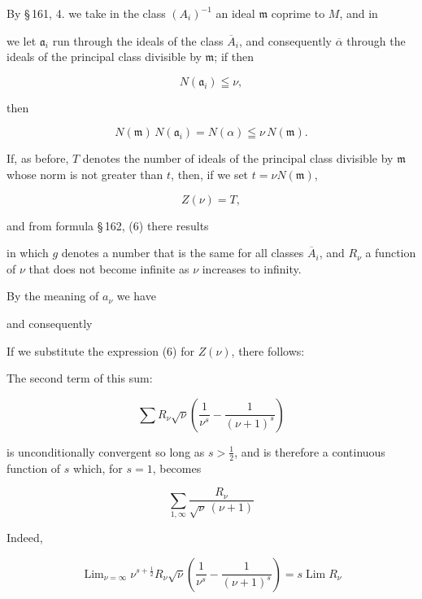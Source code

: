 
By \S\,161, 4. we take in the class $(A_i)^{-1}$ an ideal $\mathfrak{m}$ coprime to $M$, and in


we let $\mathfrak{a}_i$ run through the ideals of the class $\overline{A}_i$, and consequently $\overline{\alpha}$ through the ideals of the principal class divisible by $\mathfrak{m}$; if then

\[
N(\mathfrak{a}_i) \leqq \nu,
\]

then

\[
N(\mathfrak{m})\,N(\mathfrak{a}_i) = N(\alpha) \leqq \nu\,N(\mathfrak{m}).
\]

If, as before, $T$ denotes the number of ideals of the principal class divisible by $\mathfrak{m}$ whose norm is not greater than $t$, then, if we set $t = \nu N(\mathfrak{m})$,

\[
Z(\nu) = T,
\]

and from formula \S\,162, (6) there results


in which $g$ denotes a number that is the same for all classes $\overline{A}_i$, and $R_\nu$ a function of $\nu$ that does not become infinite as $\nu$ increases to infinity.

By the meaning of $a_\nu$ we have


and consequently


If we substitute the expression (6) for $Z(\nu)$, there follows:


The second term of this sum:

\[
\sum R_\nu\sqrt{\nu}\left(\frac{1}{\nu^s} - \frac{1}{(\nu+1)^s}\right)
\]

is unconditionally convergent so long as $s > \frac{1}{2}$, and is therefore a continuous function of $s$ which, for $s = 1$, becomes

\[
\sum_{1,\infty}\frac{R_\nu}{\sqrt{\nu}\,(\nu+1)}
\]

Indeed,

\[
\operatorname{Lim}_{\nu=\infty} \nu^{s+\frac{1}{2}} R_\nu \sqrt{\nu}\left(\frac{1}{\nu^s} - \frac{1}{(\nu+1)^s}\right) = s\operatorname{Lim} R_\nu
\]
